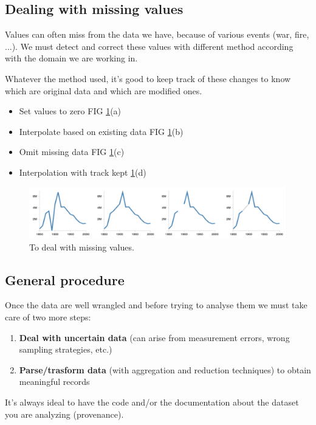 \documentclass[a4paper,11pt,twoside]{article}
\begin{document}
\subsection{Dealing with missing values}

Values can often miss from the data we have, because of various events (war, fire, ...). We must detect and correct these values with different method according with the domain we are working in.

Whatever the method used, it's good to keep track of these changes to know which are original data and which are modified ones.

\begin{itemize}
  \item Set values to zero FIG \ref{miss_val}(a)
  \item Interpolate based on existing data FIG \ref{miss_val}(b)
  \item Omit missing data FIG \ref{miss_val}(c)
  \item Interpolation with track kept \ref{miss_val}(d)
\end{itemize}

\begin{figure}[H]%
 \centering
 \includegraphics[width=12cm]{./pic/missing_values}
 \caption{\label{miss_val}To deal with missing values.}
\end{figure}

\subsection{General procedure}

Once the data are well wrangled and before trying to analyse them we must take care of two more steps:

\begin{enumerate}
  \item \textbf{Deal with uncertain data} (can arise from measurement errors, wrong sampling strategies, etc.)
  \item \textbf{Parse/trasform data} (with aggregation and reduction techniques) to obtain meaningful records
\end{enumerate}
 
It's always ideal to have the code and/or the documentation about the dataset you are analyzing (provenance).
 
\end{document}
